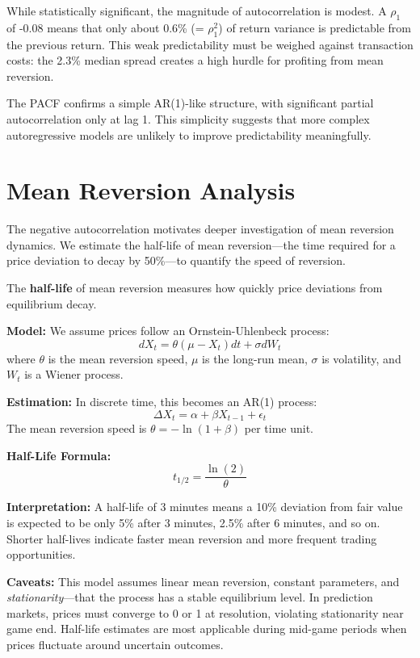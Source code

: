 While statistically significant, the magnitude of autocorrelation is modest. A $\rho_1$ of -0.08 means that only about 0.6\% (= $\rho_1^2$) of return variance is predictable from the previous return. This weak predictability must be weighed against transaction costs: the 2.3\% median spread creates a high hurdle for profiting from mean reversion.

The PACF confirms a simple AR(1)-like structure, with significant partial autocorrelation only at lag 1. This simplicity suggests that more complex autoregressive models are unlikely to improve predictability meaningfully.

\section{Mean Reversion Analysis}

The negative autocorrelation motivates deeper investigation of mean reversion dynamics. We estimate the half-life of mean reversion---the time required for a price deviation to decay by 50\%---to quantify the speed of reversion.

\begin{methodbox}
The \textbf{half-life} of mean reversion measures how quickly price deviations from equilibrium decay.

\textbf{Model:} We assume prices follow an Ornstein-Uhlenbeck process:
\begin{equation}
dX_t = \theta(\mu - X_t)dt + \sigma dW_t
\end{equation}
where $\theta$ is the mean reversion speed, $\mu$ is the long-run mean, $\sigma$ is volatility, and $W_t$ is a Wiener process.

\textbf{Estimation:} In discrete time, this becomes an AR(1) process:
\begin{equation}
\Delta X_t = \alpha + \beta X_{t-1} + \epsilon_t
\end{equation}
The mean reversion speed is $\theta = -\ln(1 + \beta)$ per time unit.

\textbf{Half-Life Formula:}
\begin{equation}
t_{1/2} = \frac{\ln(2)}{\theta}
\end{equation}

\textbf{Interpretation:} A half-life of 3 minutes means a 10\% deviation from fair value is expected to be only 5\% after 3 minutes, 2.5\% after 6 minutes, and so on. Shorter half-lives indicate faster mean reversion and more frequent trading opportunities.

\textbf{Caveats:} This model assumes linear mean reversion, constant parameters, and \textit{stationarity}---that the process has a stable equilibrium level. In prediction markets, prices must converge to 0 or 1 at resolution, violating stationarity near game end. Half-life estimates are most applicable during mid-game periods when prices fluctuate around uncertain outcomes.
\end{methodbox}


